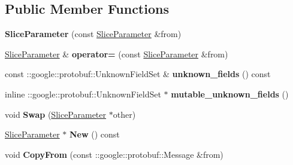 \subsection*{Public Member Functions}
\begin{DoxyCompactItemize}
\item 
\mbox{\label{classcaffe_1_1_slice_parameter_a567e673d546c727c37107b36290d49a4}} 
{\bfseries Slice\+Parameter} (const \mbox{\hyperlink{classcaffe_1_1_slice_parameter}{Slice\+Parameter}} \&from)
\item 
\mbox{\label{classcaffe_1_1_slice_parameter_abde536a5f111ced6fb8b8942566edb57}} 
\mbox{\hyperlink{classcaffe_1_1_slice_parameter}{Slice\+Parameter}} \& {\bfseries operator=} (const \mbox{\hyperlink{classcaffe_1_1_slice_parameter}{Slice\+Parameter}} \&from)
\item 
\mbox{\label{classcaffe_1_1_slice_parameter_a13c3245acd1230a29b83fdea6602983a}} 
const \+::google\+::protobuf\+::\+Unknown\+Field\+Set \& {\bfseries unknown\+\_\+fields} () const
\item 
\mbox{\label{classcaffe_1_1_slice_parameter_a60f18e6b423a96ee2a7ebae1b6c568e7}} 
inline \+::google\+::protobuf\+::\+Unknown\+Field\+Set $\ast$ {\bfseries mutable\+\_\+unknown\+\_\+fields} ()
\item 
\mbox{\label{classcaffe_1_1_slice_parameter_a23dd8e55eb852604de9cc8ff1b4a9064}} 
void {\bfseries Swap} (\mbox{\hyperlink{classcaffe_1_1_slice_parameter}{Slice\+Parameter}} $\ast$other)
\item 
\mbox{\label{classcaffe_1_1_slice_parameter_a6f93c84df56e6aee83967ce48e5e43e8}} 
\mbox{\hyperlink{classcaffe_1_1_slice_parameter}{Slice\+Parameter}} $\ast$ {\bfseries New} () const
\item 
\mbox{\label{classcaffe_1_1_slice_parameter_a571331949db9760a00744b19b7d4b6aa}} 
void {\bfseries Copy\+From} (const \+::google\+::protobuf\+::\+Message \&from)
\item 
\mbox{\label{classcaffe_1_1_slice_parameter_a09c0bfcaa7e9848c95a08aa8502197eb}} 

\end{DoxyCompactItemize}
